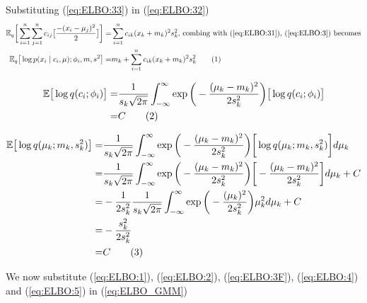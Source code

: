 \documentclass[]{article}
\newcommand{\Expectation} {\mathbb{E}}
\newcommand\numberthis    {\addtocounter{equation}{1}\tag{\theequation}}
\begin{document}
Substituting (\ref{eq:ELBO:33}) in (\ref{eq:ELBO:32})
\begin{align*}
	\Expectation_q\bigg[\sum_{i=1}^{n}\sum_{j=1}^{n} c_{ij}\big[\frac{-(x_i-\mu_j)^2}{2}\big]\bigg]=& \sum_{i=1}^{n} c_{ik} (x_k+m_k)^2 s_k^2 \text{, combing with (\ref{eq:ELBO:31}), (\ref{eq:ELBO:3}) becomes}\\
	\Expectation_q\big[\log{p(x_i\mid c_i,\mu);\phi_i,m,s^2}\big] =& m_k + \sum_{i=1}^{n} c_{ik} (x_k+m_k)^2 s_k^2 \numberthis \label{eq:ELBO:3F}	
\end{align*}


\begin{align*}
	\Expectation\big[\log{q(c_i;\phi_i)}\big] =& \frac{1}{s_k\sqrt{2\pi}} \int_{-\infty}^{\infty} \exp{\bigg(- \frac{(\mu_k-m_k)^2}{2 s_k^2}\bigg)}\big[\log{q(c_i;\phi_i)}\big]\\
	=& C \numberthis \label{eq:ELBO:4}
\end{align*}

\begin{align*}
 	\Expectation \big[\log{q(\mu_k;m_k,s^2_k)}\big] =& \frac{1}{s_k\sqrt{2\pi}} \int_{-\infty}^{\infty} \exp{\bigg(- \frac{(\mu_k-m_k)^2}{2 s_k^2}\bigg)} \bigg[\log{q(\mu_k;m_k,s^2_k)} \bigg] d\mu_k \\
 	 =& \frac{1}{s_k\sqrt{2\pi}} \int_{-\infty}^{\infty} \exp{\bigg(- \frac{(\mu_k-m_k)^2}{2 s_k^2}\bigg)} \bigg[- \frac{(\mu_k-m_k)^2}{2 s_k^2}\bigg] d\mu_k + C\\
 	  =& - \frac{1 }{2 s_k^2} \frac{1}{ s_k\sqrt{2\pi}} \int_{-\infty}^{\infty} \exp{\bigg(- \frac{(\mu_k)^2}{2 s_k^2}\bigg)} \mu_k^2 d\mu_k + C\\
 	=& - \frac{s_k^2 }{2 s_k^2} \\
 	=& C \numberthis \label{eq:ELBO:5}
\end{align*}

We now substitute (\ref{eq:ELBO:1}), (\ref{eq:ELBO:2}), (\ref{eq:ELBO:3F}), (\ref{eq:ELBO:4}) and (\ref{eq:ELBO:5}) in (\ref{eq:ELBO_GMM}) 
\printglossaries




\end{document}
